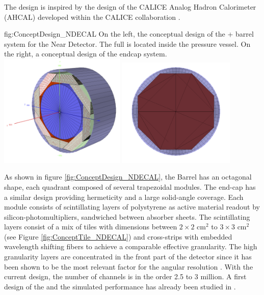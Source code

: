 The  design is inspired by the design of the CALICE Analog Hadron Calorimeter (AHCAL) \cite{collaboration:2010hb} developed within the CALICE collaboration \cite{CALICEwebsite}.
\begin{dunefigure}{fig:ConceptDesign_NDECAL}
{On the left, the conceptual design of the  +  barrel system for the Near Detector. The full  is located inside the  pressure vessel. On the right, a conceptual design of the  endcap system.}
\includegraphics[width=0.45\textwidth]{graphics/ConceptECALND.png}
\includegraphics[width=0.42\textwidth]{graphics/ECAL_Endcap_System.png}
\end{dunefigure}
As shown in figure \ref{fig:ConceptDesign_NDECAL}, the  Barrel has an octagonal shape, each quadrant composed of several trapezoidal modules. The  end-cap has a similar design providing hermeticity and a large solid-angle coverage. Each module consists of scintillating layers of polystyrene as active material readout by silicon-photomultipliers, sandwiched between absorber sheets. The scintillating layers consist of a mix of tiles with dimensions between $2\times2$ cm$^2$ to $3\times3$ cm$^2$ (see Figure \ref{fig:ConceptTile_NDECAL}) and cross-strips with embedded wavelength shifting fibers to achieve a comparable effective granularity. The high granularity layers are concentrated in the front part of the detector since it has been shown to be the most relevant factor for the angular resolution \cite{Emberger:2018pgr}. With the current design, the number of channels is in the order 2.5 to 3 million. A first design of the  and the simulated performance has already been studied in \cite{Emberger:2018pgr}.

